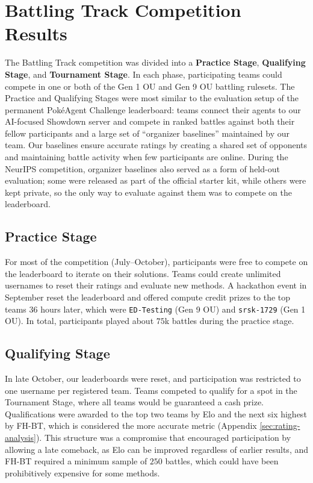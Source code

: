 \section{Battling Track Competition Results}
\label{sec:track1-full-results}


The Battling Track competition was divided into a \textbf{Practice Stage}, \textbf{Qualifying Stage}, and \textbf{Tournament Stage}. In each phase, participating teams could compete in one or both of the Gen 1 OU and Gen 9 OU battling rulesets. The Practice and Qualifying Stages were most similar to the evaluation setup of the permanent PokéAgent Challenge leaderboard: teams connect their agents to our AI-focused Showdown server and compete in ranked battles against both their fellow participants and a large set of ``organizer baselines'' maintained by our team. Our baselines ensure accurate ratings by creating a shared set of opponents and maintaining battle activity when few participants are online. During the NeurIPS competition, organizer baselines also served as a form of held-out evaluation; some were released as part of the official starter kit, while others were kept private, so the only way to evaluate against them was to compete on the leaderboard.



\subsection{Practice Stage}
For most of the competition (July--October), participants were free to compete on the leaderboard to iterate on their solutions. Teams could create unlimited usernames to reset their ratings and evaluate new methods. A hackathon event in September reset the leaderboard and offered compute credit prizes to the top teams $36$ hours later, which were \texttt{ED-Testing} (Gen 9 OU) and \texttt{srsk-1729} (Gen 1 OU). In total, participants played about $75$k battles during the practice stage.


\subsection{Qualifying Stage}

In late October, our leaderboards were reset, and participation was restricted to one username per registered team. Teams competed to qualify for a spot in the Tournament Stage, where all teams would be guaranteed a cash prize. Qualifications were awarded to the top two teams by Elo and the next six highest by FH-BT, which is considered the more accurate metric (Appendix \ref{sec:rating-analysis}). This structure was a compromise that encouraged participation by allowing a late comeback, as Elo can be improved regardless of earlier results, and FH-BT required a minimum sample of $250$ battles, which could have been prohibitively expensive for some methods. 



